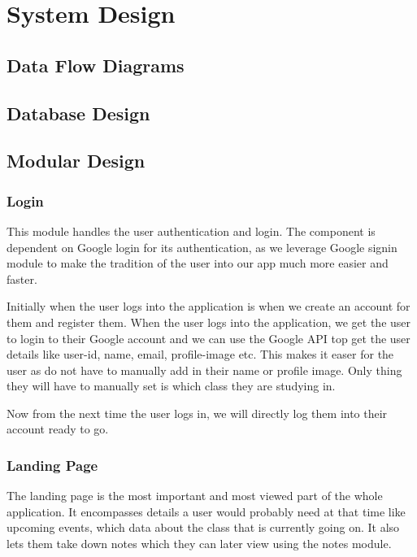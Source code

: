 \documentclass{article}
\begin{document}
\vspace{1em}

\newpage

\section{System Design}
\vspace{1em}

\subsection{Data Flow Diagrams}
\vspace{1em}
\subsection{Database Design}
\vspace{1em}
\subsection{Modular Design}

\subsubsection{Login}
This module handles the user authentication and login.
The component is dependent on Google login for its authentication, as we leverage Google signin module to make the tradition of the user into our app much more easier and faster.

Initially when the user logs into the application is when we create an account for them and register them. When the user logs into the application, we get the user to login to their Google account and we can use the Google API top get the user details like user-id, name, email, profile-image etc. This makes it easer for the user as do not have to manually add in their name or profile image. Only thing they will have to manually set is which class they are studying in.

Now from the next time the user logs in, we will directly log them into their account ready to go.

\subsubsection{Landing Page}
The landing page is the most important and most viewed part of the whole application. It encompasses details a user would probably need at that time like upcoming events, which data about the class that is currently going on. It also lets them take down notes which they can later view using the notes module.
\end{document}
